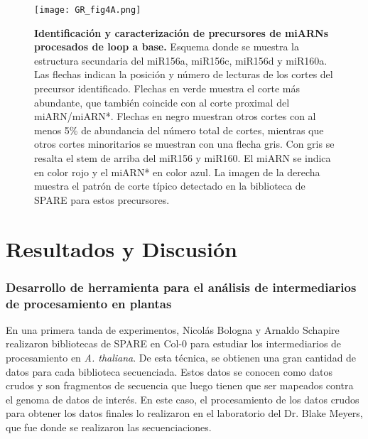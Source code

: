 \begin{figure}[htbp!] 
    \centering    
    \texttt{[image: GR\_fig4A.png]}
    \caption[Identificación y caracterización de precursores de miARNs procesados de loop a base]{
    \textbf{Identificación y caracterización de precursores de miARNs procesados de loop a base.}
    Esquema donde se muestra la estructura secundaria del miR156a, miR156c, miR156d y miR160a.
    Las flechas indican la posición y número de lecturas de los cortes del precursor identificado.
    Flechas en verde muestra el corte más abundante, que también coincide con al corte proximal del miARN/miARN*.
    Flechas en negro muestran otros cortes con al menos 5\% de abundancia del número total de cortes, mientras que otros cortes minoritarios se muestran con una flecha gris.
    Con gris se resalta el stem de arriba del miR156 y miR160. El miARN se indica en color rojo y el miARN* en color azul.
    La imagen de la derecha muestra el patrón de corte típico detectado en la biblioteca de SPARE para estos precursores.
}
    \label{fig:GR_fig4A}
\end{figure}


\section{Resultados y Discusión}


\subsubsection{Desarrollo de herramienta para el análisis de intermediarios de procesamiento en plantas}

En una primera tanda de experimentos, Nicolás Bologna y Arnaldo Schapire realizaron bibliotecas de SPARE en Col-0 para estudiar los intermediarios de procesamiento en \textit{A. thaliana}.
De esta técnica, se obtienen una gran cantidad de datos para cada biblioteca secuenciada.
Estos datos se conocen como datos crudos y son fragmentos de secuencia que luego tienen que ser mapeados contra el genoma de datos de interés.
En este caso, el procesamiento de los datos crudos para obtener los datos finales lo realizaron en el laboratorio del Dr. Blake Meyers, que fue donde se realizaron las secuenciaciones.

